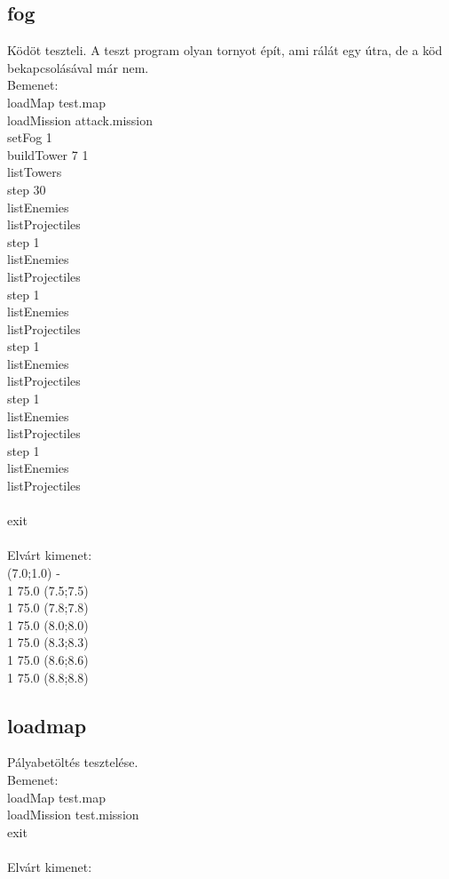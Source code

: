 \subsection{fog}
Ködöt teszteli. A teszt program olyan tornyot épít, ami rálát egy útra, de a köd bekapcsolásával már nem. \\
Bemenet:\\
loadMap test.map\\
loadMission attack.mission\\
setFog 1\\
buildTower 7 1\\
listTowers\\
step 30\\
listEnemies\\
listProjectiles\\
step 1\\
listEnemies\\
listProjectiles\\
step 1\\
listEnemies\\
listProjectiles\\
step 1\\
listEnemies\\
listProjectiles\\
step 1\\
listEnemies\\
listProjectiles\\
step 1\\
listEnemies\\
listProjectiles\\
\\
exit\\
\\
Elvárt kimenet:\\
(7.0;1.0) -\\
1 75.0 (7.5;7.5)\\
1 75.0 (7.8;7.8)\\
1 75.0 (8.0;8.0)\\
1 75.0 (8.3;8.3)\\
1 75.0 (8.6;8.6)\\
1 75.0 (8.8;8.8)\\
\subsection{loadmap}
Pályabetöltés tesztelése.\\
Bemenet:\\
loadMap test.map\\
loadMission test.mission\\
exit\\
\\
Elvárt kimenet: \\
\\

